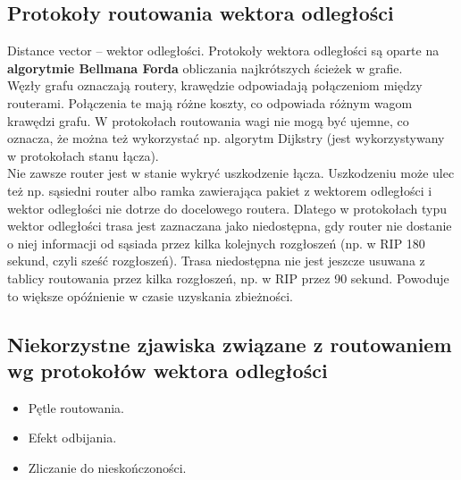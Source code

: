 \documentclass[../main.tex]{subfiles}
\begin{document}
    \subsection{Protokoły routowania wektora odległości}
    Distance vector – wektor odległości. Protokoły wektora odległości są oparte na \textbf{algorytmie Bellmana Forda} obliczania najkrótszych ścieżek w grafie.\\
    Węzły grafu oznaczają routery, krawędzie odpowiadają połączeniom między routerami.
    Połączenia te mają różne koszty, co odpowiada różnym wagom krawędzi grafu.
    W protokołach routowania wagi nie mogą być ujemne, co oznacza, że można też
    wykorzystać np. algorytm Dijkstry (jest wykorzystywany w protokołach stanu łącza).\\

    Nie zawsze router jest w stanie wykryć uszkodzenie łącza. Uszkodzeniu
    może ulec też np. sąsiedni router albo ramka zawierająca pakiet z wektorem odległości i wektor
    odległości nie dotrze do docelowego routera. Dlatego w protokołach typu wektor odległości
    trasa jest zaznaczana jako niedostępna, gdy router nie dostanie o niej informacji od sąsiada
    przez kilka kolejnych rozgłoszeń (np. w RIP 180 sekund, czyli sześć
    rozgłoszeń). Trasa niedostępna nie jest jeszcze usuwana z tablicy routowania przez
    kilka rozgłoszeń, np. w RIP przez 90 sekund. Powoduje to większe opóźnienie w czasie uzyskania zbieżności.\\

    \subsection{Niekorzystne zjawiska związane z routowaniem wg protokołów wektora odległości}
    \begin{itemize}
        \item Pętle routowania.
        \item Efekt odbijania.
        \item Zliczanie do nieskończoności.
    \end{itemize}
\end{document}
